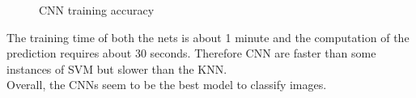 \documentclass{article}
\begin{document}
\begin{figure}[H] 
  \begin{adjustwidth}{-4cm}{-4cm}
     \centering
     \caption{CNN training accuracy} \label{cnn} 
      \end{adjustwidth}
   \end{figure}
\noindent The training time of both the nets is about 1 minute and the computation of the prediction requires about 30 seconds. Therefore CNN are faster than some instances of SVM but slower than the KNN.\\
Overall, the CNNs seem to be the best model to classify images.
\end{document}
